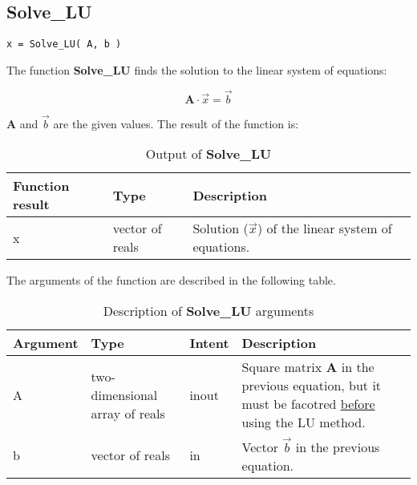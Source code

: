 \subsection*{Solve\_LU}

\lstset{language=Fortran}
\begin{lstlisting}[frame=trBL]
x = Solve_LU( A, b )
\end{lstlisting}

The function \textbf{Solve\_LU} finds the solution to the linear system of equations:

\begin{equation*}
	\textbf{A}\cdot\vec{x}=\vec{b}
\end{equation*}

$\textbf{A}$ and $\vec{b}$ are the given values. The result of the function is:

\begin{table}[H]
	\begin{center}
	\begin{spacing}{1.2}
		\begin{tabular}{| l | l | p{6cm} |}
			
			\hline
			
			\bf Function result & \bf Type & \bf Description \\ \hline \hline
			
			x & vector of reals & Solution ($\vec{x}$) of the linear system of equations.\\ \hline
			
		\end{tabular}
	\end{spacing}
	\end{center}
	\caption{Output of \textbf{Solve\_LU}}
\end{table}

The arguments of the function are described in the following table.

\begin{table}[H]
	\begin{center}		
	\begin{spacing}{1.2}
		\begin{tabular}{| l | l | l | p{6cm} |}
			
\hline
			
\bf Argument & \bf Type & \bf Intent & \bf Description \\ \hline \hline
			
A & two-dimensional array of reals & inout & Square matrix $\textbf{A}$ in the previous equation, but it must be facotred \underline{before} using the LU method.\\ \hline
			
b & vector of reals & in & Vector $\vec{b}$ in the previous equation. \\ \hline
			
		\end{tabular}		
	\end{spacing}
	\end{center}
	\caption{Description of \textbf{Solve\_LU} arguments}
\end{table}

